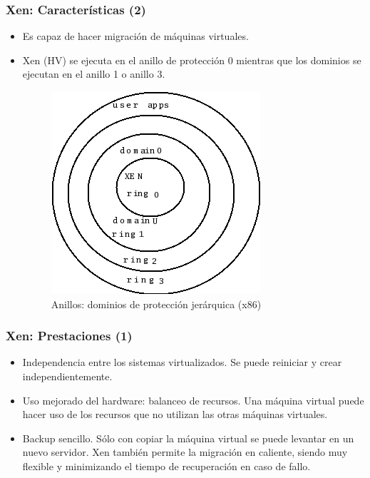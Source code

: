 \documentclass{beamer}
\begin{document}
\begin{frame}
\frametitle{Xen: Características (2)}

\begin{itemize}
\item Es capaz de hacer \alert{migración} de máquinas virtuales.
\item Xen (HV) se ejecuta en el anillo de protección 0 mientras que los dominios se ejecutan en el anillo 1 o anillo 3.

\begin{figure}
  \centering
\includegraphics[scale=0.40,clip=false]{figs/rings-xen.png}
  \caption{\footnotesize{Anillos: dominios de protección jerárquica (x86)}}
\end{figure}

\end{itemize}

\end{frame}



\begin{frame}
\frametitle{Xen: Prestaciones (1)}
\begin{itemize}

\item Independencia entre los sistemas virtualizados. Se puede reiniciar y crear independientemente.
\item Uso mejorado del hardware: balanceo de recursos. Una máquina virtual puede hacer uso de los recursos que no utilizan las otras máquinas virtuales.
\item Backup sencillo. Sólo con copiar la máquina virtual se puede levantar en un nuevo servidor. Xen también permite la migración en caliente, siendo muy flexible y minimizando el tiempo de recuperación en caso de fallo.
\end{itemize}

\end{frame}
\end{document}
